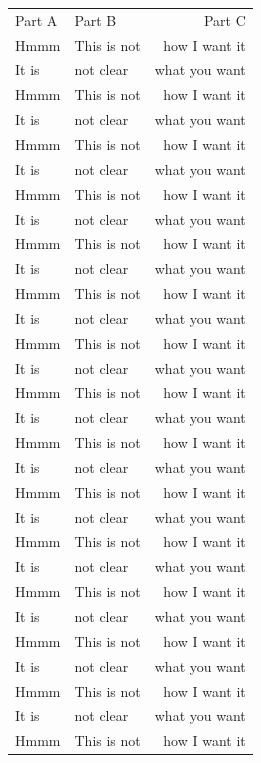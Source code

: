 \documentclass[phd,showframe]{ndsu-thesis-2022}
\begin{document}
\begin{longtable}{l @{\hspace{2cm}} l @{\hspace{1.5cm}} r}
Part A  &   Part B      &   Part C      \\
Hmmm    & This is not   & how I want it \\
It is   & not clear     & what you want \\
Hmmm    & This is not   & how I want it \\
It is   & not clear     & what you want \\
Hmmm    & This is not   & how I want it \\
It is   & not clear     & what you want \\
Hmmm    & This is not   & how I want it \\
It is   & not clear     & what you want \\
Hmmm    & This is not   & how I want it \\
It is   & not clear     & what you want \\
Hmmm    & This is not   & how I want it \\
It is   & not clear     & what you want \\
Hmmm    & This is not   & how I want it \\
It is   & not clear     & what you want \\
Hmmm    & This is not   & how I want it \\
It is   & not clear     & what you want \\
Hmmm    & This is not   & how I want it \\
It is   & not clear     & what you want \\
Hmmm    & This is not   & how I want it \\
It is   & not clear     & what you want \\
Hmmm    & This is not   & how I want it \\
It is   & not clear     & what you want \\
Hmmm    & This is not   & how I want it \\
It is   & not clear     & what you want \\
Hmmm    & This is not   & how I want it \\
It is   & not clear     & what you want \\
Hmmm    & This is not   & how I want it \\
It is   & not clear     & what you want \\
Hmmm    & This is not   & how I want it \\

\end{longtable}
\end{document}
